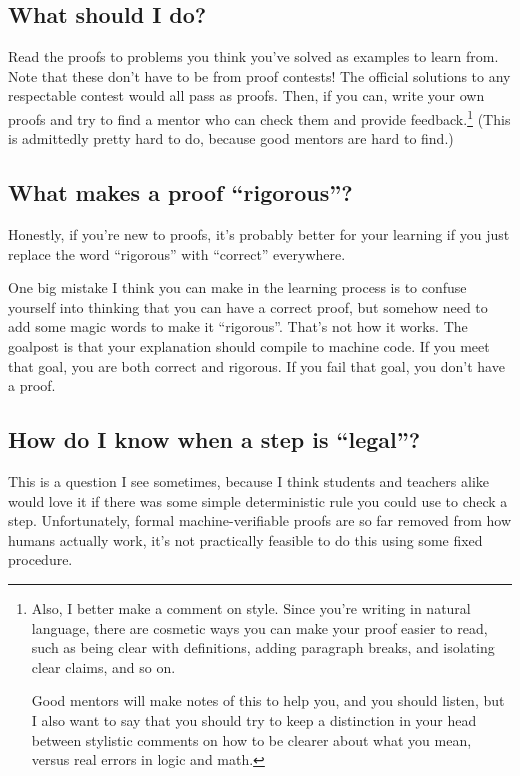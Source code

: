 \documentclass[11pt]{scrartcl}
\begin{document}
\subsection{What should I do?}
Read the proofs to problems you think you've solved as examples to learn from.
Note that these don’t have to be from proof contests!
The official solutions to any respectable contest would all pass as proofs.
Then, if you can, write your own proofs and
try to find a mentor who can check them and provide feedback.\footnote{Also,
  I better make a comment on style.
  Since you're writing in natural language,
  there are cosmetic ways you can make your proof easier to read,
  such as being clear with definitions, adding paragraph breaks,
  and isolating clear claims, and so on.

  Good mentors will make notes of this to help you, and you should listen,
  but I also want to say that you should try to keep a distinction in your head
  between stylistic comments on how to be clearer about what you mean,
  versus real errors in logic and math.}
(This is admittedly pretty hard to do, because good mentors are hard to find.)

\subsection{What makes a proof ``rigorous''?}
Honestly, if you're new to proofs,
it's probably better for your learning if you just replace the word
``rigorous'' with ``correct'' everywhere.

One big mistake I think you can make in the learning process
is to confuse yourself into thinking that you can have a correct proof,
but somehow need to add some magic words to make it ``rigorous''.
That's not how it works.
The goalpost is that your explanation should compile to machine code.
If you meet that goal, you are both correct and rigorous.
If you fail that goal, you don't have a proof.

\subsection{How do I know when a step is ``legal''?}
This is a question I see sometimes,
because I think students and teachers alike would love it if
there was some simple deterministic rule you could use to check a step.
Unfortunately, formal machine-verifiable proofs
are so far removed from how humans actually work,
it's not practically feasible to do this using some fixed procedure.
\end{document}
